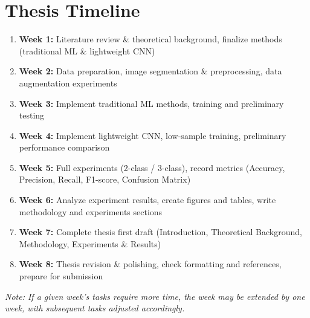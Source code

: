 \section{Thesis Timeline}

\begin{enumerate}
    \item \textbf{Week 1:} Literature review \& theoretical background, finalize methods (traditional ML \& lightweight CNN)
    \item \textbf{Week 2:} Data preparation, image segmentation \& preprocessing, data augmentation experiments
    \item \textbf{Week 3:} Implement traditional ML methods, training and preliminary testing
    \item \textbf{Week 4:} Implement lightweight CNN, low-sample training, preliminary performance comparison
    \item \textbf{Week 5:} Full experiments (2-class / 3-class), record metrics (Accuracy, Precision, Recall, F1-score, Confusion Matrix)
    \item \textbf{Week 6:} Analyze experiment results, create figures and tables, write methodology and experiments sections
    \item \textbf{Week 7:} Complete thesis first draft (Introduction, Theoretical Background, Methodology, Experiments \& Results)
    \item \textbf{Week 8:} Thesis revision \& polishing, check formatting and references, prepare for submission
\end{enumerate}

\noindent
\textit{Note: If a given week's tasks require more time, the week may be extended by one week, with subsequent tasks adjusted accordingly.}

